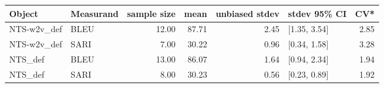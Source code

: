 \begin{tabular}{llrrrlr}
\toprule
      Object & Measurand & sample size &  mean & unbiased stdev &  stdev 95\% CI &  CV* \\
\midrule
 NTS-w2v\_def &      BLEU &       12.00 & 87.71 &           2.45 &  [1.35, 3.54] & 2.85 \\
 NTS-w2v\_def &      SARI &        7.00 & 30.22 &           0.96 &  [0.34, 1.58] & 3.28 \\
     NTS\_def &      BLEU &       13.00 & 86.07 &           1.64 &  [0.94, 2.34] & 1.94 \\
     NTS\_def &      SARI &        8.00 & 30.23 &           0.56 &  [0.23, 0.89] & 1.92 \\
\bottomrule
\end{tabular}

